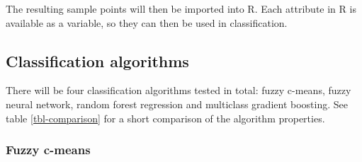 \documentclass[a4paper,10pt]{article}
\begin{document}
The resulting sample points will then be imported into R. Each attribute in R is available as a variable, so they can then be used in classification.

\subsection{Classification algorithms}

There will be four classification algorithms tested in total: fuzzy c-means, fuzzy neural network, random forest regression and multiclass gradient boosting. See table \ref{tbl-comparison} for a short comparison of the algorithm properties.

\begin{table}
  \begin{center}
  \end{center}
  \caption{Feature comparison between classification algorithms whose classification accuracy will be compared in the thesis.}
  \label{tbl-comparison}
\end{table}

\subsubsection{Fuzzy c-means}
\end{document}
